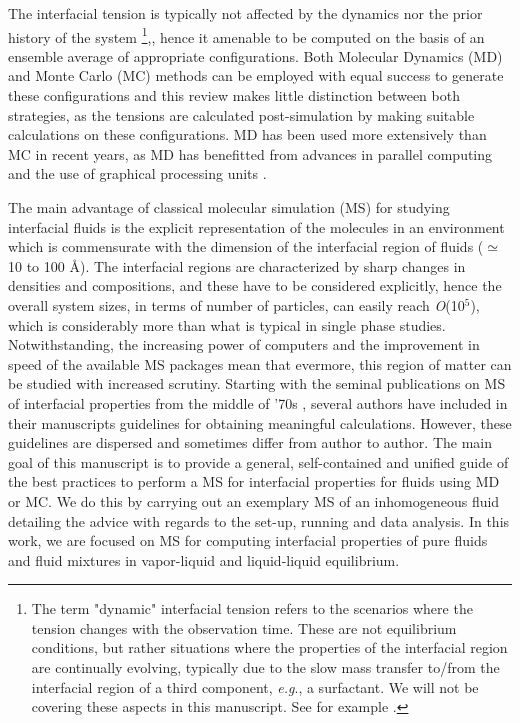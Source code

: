 \documentclass{scrbook}
\begin{document}
The interfacial tension is typically not affected by the dynamics nor the prior
history of the system \footnote{The term "dynamic" interfacial tension
refers to the scenarios where the tension changes with the observation time.
These are not equilibrium conditions, but rather situations where the
properties of the interfacial region are continually evolving, typically due to
the slow mass transfer to/from the interfacial region of a third component,
\textit{e.g}., a surfactant. We will not be covering these aspects in this
manuscript. See for example \citet{dukhin1995}.},\citep{rowlinson1982}, hence it amenable to be computed on
the basis of an ensemble average of appropriate configurations. Both Molecular
Dynamics (MD) \citep{allen2017} and Monte Carlo (MC) \citep{frenkel2002} methods can be employed
with equal success to generate these configurations and this review makes
little distinction between both strategies, as the tensions are calculated
post-simulation by making suitable calculations on these configurations. MD has
been used more extensively than MC in recent years, as MD has benefitted from
advances in parallel computing and the use of graphical processing units \citep{faraday2014}.

The main advantage of classical molecular simulation (MS) for studying
interfacial fluids is the explicit representation of the molecules in an
environment which is commensurate with the dimension of the interfacial region
of fluids (${\simeq}$ 10 to 100 \AA{}). The interfacial regions are
characterized by sharp changes in densities and compositions, and these have to
be considered explicitly, hence the overall system sizes, in terms of number of
particles, can easily reach \textit{O}(10$^{5}$), which is considerably more
than what is typical in single phase studies. Notwithstanding, the increasing
power of computers and the improvement in speed of the available MS packages
mean that evermore, this region of matter can be studied with increased
scrutiny. Starting with the seminal publications on MS of interfacial
properties from the middle of '70s \citep{liu1974}, several
authors have included in their manuscripts guidelines for obtaining meaningful
calculations. However, these guidelines are dispersed and sometimes differ from
author to author. The main goal of this manuscript is to provide a general,
self-contained and unified guide of the best practices to perform a MS for
interfacial properties for fluids using MD or MC. We do this by carrying out an
exemplary MS of an inhomogeneous fluid detailing the advice with regards to the
set-up, running and data analysis. In this work, we are focused on MS for
computing interfacial properties of pure fluids and fluid mixtures in
vapor-liquid and liquid-liquid equilibrium. 
\end{document}
